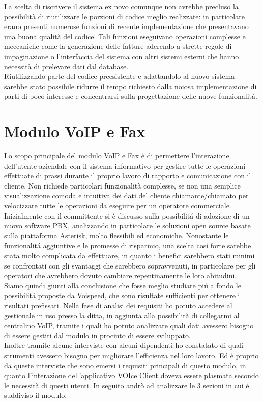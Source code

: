La scelta di riscrivere il sistema ex novo comunque non avrebbe precluso la possibilit\`a di riutilizzare le porzioni di codice meglio realizzate: in particolare erano presenti numerose funzioni di recente implementazione che presentavano una buona qualit\`a del codice. Tali funzioni eseguivano operazioni complesse e meccaniche come la generazione delle fatture aderendo a strette regole di impaginazione o l'interfaccia del sistema con altri sistemi esterni che hanno necessit\`a di prelevare dati dal database. \\
Riutilizzando parte del codice preesistente e adattandolo al nuovo sistema sarebbe stato possibile  ridurre il tempo richiesto dalla noiosa implementazione di parti di poco interesse  e concentrarsi sulla progettazione delle nuove funzionalit\`a.

\section{Modulo VoIP e Fax}
Lo scopo principale del modulo VoIP e Fax \`e di permettere l'interazione dell'utente aziendale con il sistema informativo per gestire tutte le operazioni effettuate di prassi durante il proprio lavoro di rapporto e comunicazione con il cliente. Non richiede particolari funzionalit\`a complesse, se non una semplice visualizzazione comoda e intuitiva dei dati del cliente chiamante/chiamato per velocizzare tutte le operazioni da eseguire per un operatore commerciale. \\
Inizialmente con il committente si \`e discusso sulla possibilit\'a di adozione di un nuovo software PBX, analizzando in particolare le soluzioni open source basate sulla piattaforma Asterisk, molto flessibili ed economiche. Nonostante le funzionalit\'a aggiuntive e le promesse di risparmio, una scelta cos\'i forte sarebbe stata molto complicata da effettuare, in quanto i benefici sarebbero stati minimi se confrontati con gli svantaggi che sarebbero sopravvenuti, in particolare per gli operatori che avrebbero dovuto cambiare repentinamente le loro abitudini. \\
Siamo quindi giunti alla conclusione che fosse meglio studiare pi\'u a fondo le possibilit\'a proposte da Voispeed, che sono risultate sufficienti per ottenere i risultati prefissati. Nella fase di analisi dei requisiti ho potuto accedere al gestionale in uso presso la ditta, in aggiunta alla possibilit\`a di collegarmi al centralino VoIP, tramite i quali ho potuto analizzare quali dati avessero bisogno di essere gestiti dal modulo in procinto di essere sviluppato. \\
Inoltre tramite alcune interviste con alcuni dipendenti ho constatato di quali strumenti avessero bisogno per migliorare l'efficienza nel loro lavoro. Ed \`e proprio da queste interviste che sono emersi i requisiti principali di questo modulo, in quanto l'interazione dell'applicativo VOIce Client doveva essere plasmata secondo le necessit\`a di questi utenti. In seguito andr\`o ad analizzare le 3 sezioni in cui \'e suddiviso il modulo.

